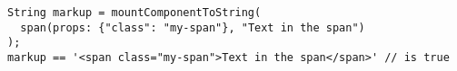 \begin{verbatim}
String markup = mountComponentToString(
  span(props: {"class": "my-span"}, "Text in the span")
);
markup == '<span class="my-span">Text in the span</span>' // is true
\end{verbatim}
